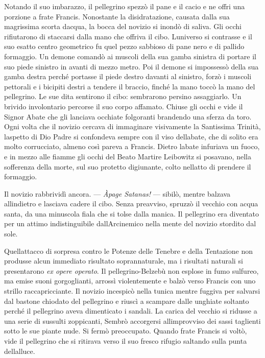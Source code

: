 Notando il suo imbarazzo, il pellegrino spezzò il pane e il cacio e ne
offri una porzione a frate Francis. Nonostante la disidratazione,
causata dalla sua magrissima scorta d\textquotesingle acqua, la bocca
del novizio si inondò di saliva. Gli occhi rifiutarono di staccarsi
dalla mano che offriva il cibo. L\textquotesingle universo si contrasse
e il suo esatto centro geometrico fu quel pezzo sabbioso di pane nero e
di pallido formaggio. Un demone comandò ai muscoli della sua gamba
sinistra di portare il suo piede sinistro in avanti di mezzo metro. Poi
il demone si impossessò della sua gamba destra perché portasse il piede
destro davanti al sinistro, forzò i muscoli pettorali e i bicipiti
destri a tendere il braccio, finché la mano toccò la mano del
pellegrino. Le sue dita sentirono il cibo: sembrarono persino
assaggiarlo. Un brivido involontario percorse il suo corpo affamato.
Chiuse gli occhi e vide il Signor Abate che gli lanciava occhiate
folgoranti brandendo una sferza da toro. Ogni volta che il novizio
cercava di immaginare visivamente la Santissima Trinità,
l\textquotesingle aspetto di Dio Padre si confondeva sempre con il viso
dell\textquotesingle abate, che di solito era molto corrucciato, almeno
così pareva a Francis. Dietro l\textquotesingle abate infuriava un
fuoco, e in mezzo alle fiamme gli occhi del Beato Martire Leibowitz si
posavano, nella sofferenza della morte, sul suo protetto digiunante,
colto nell\textquotesingle atto di prendere il formaggio.

Il novizio rabbrividì ancora. --- \emph{Àpage Satanas!} --- sibilò,
mentre balzava all\textquotesingle indietro e lasciava cadere il cibo.
Senza preavviso, spruzzò il vecchio con acqua santa, da una minuscola
fiala che si tolse dalla manica. Il pellegrino era diventato per un
attimo indistinguibile dall\textquotesingle Arcinemico nella mente del
novizio stordito dal sole.

Quell\textquotesingle attacco di sorpresa contro le Potenze delle
Tenebre e della Tentazione non produsse alcun immediato risultato
soprannaturale, ma i risultati naturali si presentarono \emph{ex opere
	operato}. Il pellegrino-Belzebù non esplose in fumo sulfureo, ma emise
suoni gorgoglianti, arrossì violentemente e balzò verso Francis con uno
strillo raccapricciante. Il novizio incespicò nella tunica mentre
fuggiva per salvarsi dal bastone chiodato del pellegrino e riuscì a
scampare dalle unghiate soltanto perché il pellegrino aveva dimenticato
i sandali. La carica del vecchio si ridusse a una serie di sussulti
zoppicanti, Sembrò accorgersi all\textquotesingle improvviso dei sassi
taglienti sotto le sue piante nude. Si fermò preoccupato. Quando frate
Francis si voltò, vide il pellegrino che si ritirava verso il suo fresco
rifugio saltando sulla punta dell\textquotesingle alluce.

